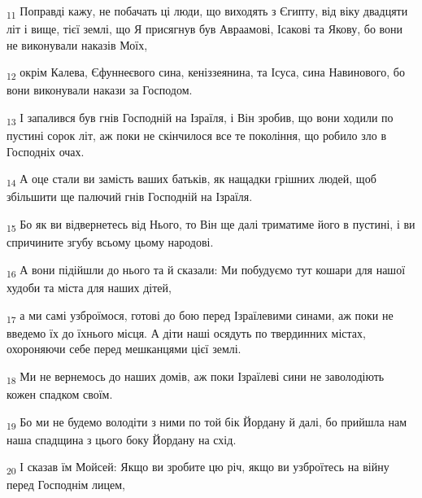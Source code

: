 \begin{tcolorbox}
\textsubscript{11} Поправді кажу, не побачать ці люди, що виходять з Єгипту, від віку двадцяти літ і вище, тієї землі, що Я присягнув був Авраамові, Ісакові та Якову, бо вони не виконували наказів Моїх,
\end{tcolorbox}
\begin{tcolorbox}
\textsubscript{12} окрім Калева, Єфуннеєвого сина, кеніззеянина, та Ісуса, сина Навинового, бо вони виконували накази за Господом.
\end{tcolorbox}
\begin{tcolorbox}
\textsubscript{13} І запалився був гнів Господній на Ізраїля, і Він зробив, що вони ходили по пустині сорок літ, аж поки не скінчилося все те покоління, що робило зло в Господніх очах.
\end{tcolorbox}
\begin{tcolorbox}
\textsubscript{14} А оце стали ви замість ваших батьків, як нащадки грішних людей, щоб збільшити ще палючий гнів Господній на Ізраїля.
\end{tcolorbox}
\begin{tcolorbox}
\textsubscript{15} Бо як ви відвернетесь від Нього, то Він ще далі триматиме його в пустині, і ви спричините згубу всьому цьому народові.
\end{tcolorbox}
\begin{tcolorbox}
\textsubscript{16} А вони підійшли до нього та й сказали: Ми побудуємо тут кошари для нашої худоби та міста для наших дітей,
\end{tcolorbox}
\begin{tcolorbox}
\textsubscript{17} а ми самі узброїмося, готові до бою перед Ізраїлевими синами, аж поки не введемо їх до їхнього місця. А діти наші осядуть по твердинних містах, охороняючи себе перед мешканцями цієї землі.
\end{tcolorbox}
\begin{tcolorbox}
\textsubscript{18} Ми не вернемось до наших домів, аж поки Ізраїлеві сини не заволодіють кожен спадком своїм.
\end{tcolorbox}
\begin{tcolorbox}
\textsubscript{19} Бо ми не будемо володіти з ними по той бік Йордану й далі, бо прийшла нам наша спадщина з цього боку Йордану на схід.
\end{tcolorbox}
\begin{tcolorbox}
\textsubscript{20} І сказав їм Мойсей: Якщо ви зробите цю річ, якщо ви узброїтесь на війну перед Господнім лицем,
\end{tcolorbox}
